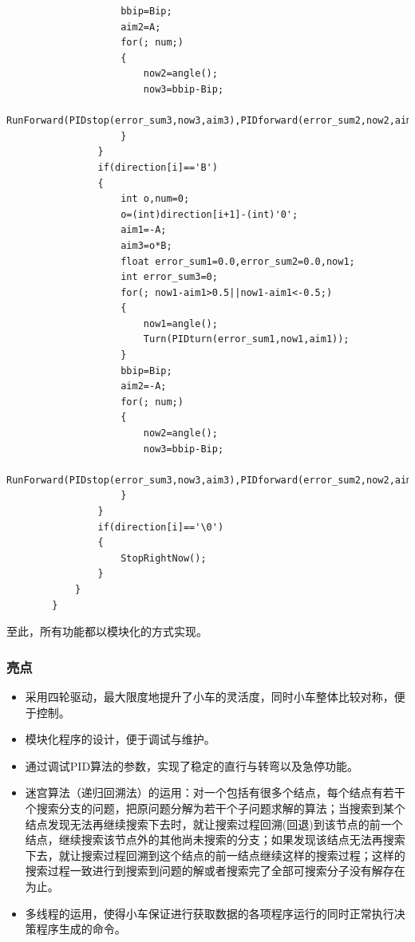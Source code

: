 \documentclass[UTF8]{ctexart}
\begin{document}
\begin{lstlisting}
                    bbip=Bip;
                    aim2=A;
                    for(; num;)
                    {
                        now2=angle();
                        now3=bbip-Bip;
                        RunForward(PIDstop(error_sum3,now3,aim3),PIDforward(error_sum2,now2,aim2));
                    }
                }
                if(direction[i]=='B')
                {
                    int o,num=0;
                    o=(int)direction[i+1]-(int)'0';
                    aim1=-A;
                    aim3=o*B;
                    float error_sum1=0.0,error_sum2=0.0,now1;
                    int error_sum3=0;
                    for(; now1-aim1>0.5||now1-aim1<-0.5;)
                    {
                        now1=angle();
                        Turn(PIDturn(error_sum1,now1,aim1));
                    }
                    bbip=Bip;
                    aim2=-A;
                    for(; num;)
                    {
                        now2=angle();
                        now3=bbip-Bip;
                        RunForward(PIDstop(error_sum3,now3,aim3),PIDforward(error_sum2,now2,aim2));
                    }
                }
                if(direction[i]=='\0')
                {
                    StopRightNow();
                }
            }
        }
        \end{lstlisting}

        至此，所有功能都以模块化的方式实现。
\subsubsection{亮点}

\begin{itemize}
\item 采用四轮驱动，最大限度地提升了小车的灵活度，同时小车整体比较对称，便于控制。
\item 模块化程序的设计，便于调试与维护。
\item 通过调试PID算法的参数，实现了稳定的直行与转弯以及急停功能。
\item 迷宫算法（递归回溯法）的运用：对一个包括有很多个结点，每个结点有若干个搜索分支的问题，把原问题分解为若干个子问题求解的算法；当搜索到某个结点发现无法再继续搜索下去时，就让搜索过程回溯(回退)到该节点的前一个结点，继续搜索该节点外的其他尚未搜索的分支；如果发现该结点无法再搜索下去，就让搜索过程回溯到这个结点的前一结点继续这样的搜索过程；这样的搜索过程一致进行到搜索到问题的解或者搜索完了全部可搜索分子没有解存在为止。
\item 多线程的运用，使得小车保证进行获取数据的各项程序运行的同时正常执行决策程序生成的命令。
\end{itemize}
\end{document}
